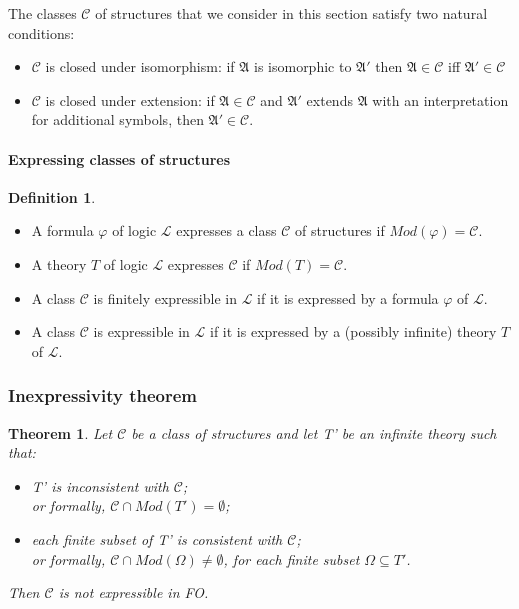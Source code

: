 \documentclass[10pt,a4paper]{article}
\theoremstyle{definition}
\newtheorem{definition}{Definition}[section]
\newtheorem{theorem}{Theorem}
\begin{document}
\noindent
The classes $\mathcal{C}$ of structures that we consider in this section satisfy two natural conditions:

\begin{itemize}
	\item $\mathcal{C}$ is closed under isomorphism: if $\mathfrak{A}$ is isomorphic to $\mathfrak{A}'$ then $\mathfrak{A} \in \mathcal{C}$ iff $\mathfrak{A}' \in \mathcal{C}$  
	\item $\mathcal{C}$ is closed under extension: if $\mathfrak{A} \in \mathcal{C}$ and $\mathfrak{A}'$ extends $\mathfrak{A}$ with an interpretation for additional symbols, then $\mathfrak{A}' \in \mathcal{C}$.
\end{itemize}

\paragraph{Expressing classes of structures}

\begin{definition}
\begin{itemize}
	\item A formula $\varphi$ of logic $\mathcal{L}$ expresses a class $\mathcal{C}$ of structures if $Mod(\varphi) = \mathcal{C}$.
	\item A theory $T$ of logic $\mathcal{L}$ expresses $\mathcal{C}$ if $Mod(T) = \mathcal{C}$.
	\item A class $\mathcal{C}$ is finitely expressible in $\mathcal{L}$ if it is expressed by a formula $\varphi$ of $\mathcal{L}$.
	\item A class $\mathcal{C}$ is expressible in $\mathcal{L}$ if it is expressed by a (possibly infinite) theory $T$ of $\mathcal{L}$.
\end{itemize}
\end{definition}

\subsubsection{Inexpressivity theorem}

\begin{theorem}
\textit{Let $\mathcal{C}$ be a class of structures and let T' be an infinite theory such that:}
\begin{itemize}
	\item \textit{T' is inconsistent with $\mathcal{C}$; \\
	or formally, $\mathcal{C} \cap Mod(T') = \emptyset$;}
	\item \textit{each finite subset of T' is consistent with $\mathcal{C}$;\\
	 or formally, $\mathcal{C} \cap Mod(\Omega) \neq \emptyset$, for each finite subset $\Omega \subseteq T'$.}
\end{itemize}
\textit{Then $\mathcal{C}$ is not expressible in FO.}
\end{theorem}
\end{document}
